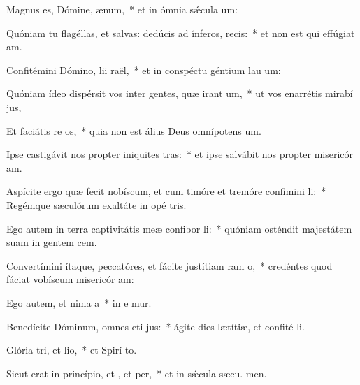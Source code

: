 \item Magnus es, Dómine,  ænum,~* et in ómnia sǽcula  um:
\item Quóniam tu flagéllas, et salvas: dedúcis ad ínferos,  recis:~* et non est qui effúgiat  am.
\item Confitémini Dómino, lii raël,~* et in conspéctu géntium lau um:
\item Quóniam ídeo dispérsit vos inter gentes, quæ irant um,~* ut vos enarrétis mirabí jus,
\item Et faciátis re os,~* quia non est álius Deus omnípotens  um.
\item Ipse castigávit nos propter iniquites tras:~* et ipse salvábit nos propter misericór am.
\item Aspícite ergo quæ fecit nobíscum, et cum timóre et tremóre confimini li:~* Regémque sæculórum exaltáte in opé tris.
\item Ego autem in terra captivitátis meæ confibor li:~* quóniam osténdit majestátem suam in gentem cem.
\item Convertímini ítaque, peccatóres, et fácite justítiam ram o,~* credéntes quod fáciat vobíscum misericór am:
\item Ego autem, et nima a~* in e mur.
\item Benedícite Dóminum, omnes eti jus:~* ágite dies lætítiæ, et confité li.
\item Glória tri, et lio,~* et Spirí to.
\item Sicut erat in princípio, et , et per,~* et in sǽcula sæcu. men.

